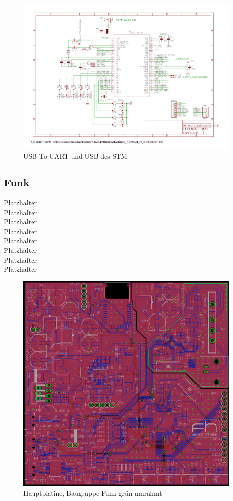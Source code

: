 \documentclass[a4paper]{scrartcl}
\begin{document}
\begin{figure}[H]\centering
\includegraphics[page=2, angle=90, width=\linewidth]{../eagle/Mainboard/watchplb_mainboard_v1_0.pdf}
\caption{USB-To-UART und USB des STM}
\label{fig:abb1}
\end{figure}

\subsection{Funk}

Platzhalter\\Platzhalter\\Platzhalter\\Platzhalter\\Platzhalter\\Platzhalter\\
Platzhalter\\Platzhalter

\begin{figure}[H]\centering
\includegraphics[page=1, angle=0, width=\linewidth]{../Documentation/pics/mainboard_funk.png}
\caption{Hauptplatine, Baugruppe Funk grün umrahmt}
\label{fig:abb1}
\end{figure}
\end{document}
